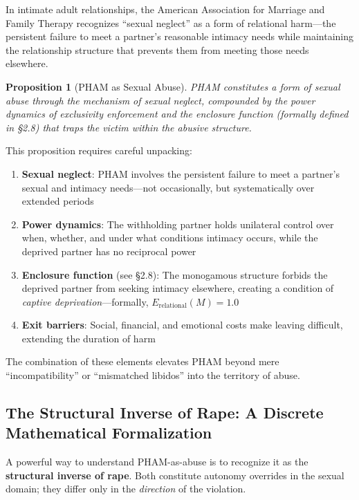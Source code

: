 \documentclass[12pt,openany]{book}
\newtheorem{proposition}{Proposition}[chapter]
\numberwithin{equation}{chapter}
\begin{document}
In intimate adult relationships, the American Association for Marriage and Family Therapy recognizes ``sexual neglect'' as a form of relational harm---the persistent failure to meet a partner's reasonable intimacy needs while maintaining the relationship structure that prevents them from meeting those needs elsewhere.

\begin{proposition}[PHAM as Sexual Abuse]
PHAM constitutes a form of sexual abuse through the mechanism of sexual neglect, compounded by the power dynamics of exclusivity enforcement and the enclosure function (formally defined in \S 2.8) that traps the victim within the abusive structure.
\end{proposition}

This proposition requires careful unpacking:

\begin{enumerate}
    \item \textbf{Sexual neglect}: PHAM involves the persistent failure to meet a partner's sexual and intimacy needs---not occasionally, but systematically over extended periods
    
    \item \textbf{Power dynamics}: The withholding partner holds unilateral control over when, whether, and under what conditions intimacy occurs, while the deprived partner has no reciprocal power
    
    \item \textbf{Enclosure function} (see \S 2.8): The monogamous structure forbids the deprived partner from seeking intimacy elsewhere, creating a condition of \textit{captive deprivation}---formally, $E_{\text{relational}}(M) = 1.0$
    
    \item \textbf{Exit barriers}: Social, financial, and emotional costs make leaving difficult, extending the duration of harm
\end{enumerate}

The combination of these elements elevates PHAM beyond mere ``incompatibility'' or ``mismatched libidos'' into the territory of abuse.

\subsection{The Structural Inverse of Rape: A Discrete Mathematical Formalization}

A powerful way to understand PHAM-as-abuse is to recognize it as the \textbf{structural inverse of rape}. Both constitute autonomy overrides in the sexual domain; they differ only in the \textit{direction} of the violation.
\end{document}
